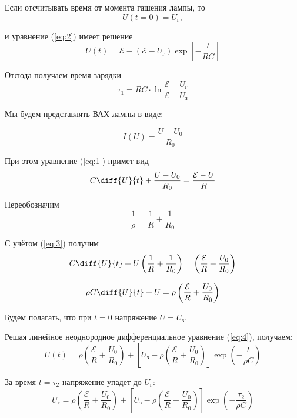 Если отсчитывать время от момента гашения лампы, то 
\begin{equation}
U(t=0)=U_{\text{г}},
\end{equation}

и уравнение (\ref{eq:2}) имеет решение
\begin{equation}
	U(t)= \mathcal{E}-(\mathcal{E}-U_{\text{г}}) \exp{\left[- \frac{t}{RC} \right] }
	\end{equation}

Отсюда получаем время зарядки
\begin{equation}
\label{tau:1}
	\tau_1=RC\cdot \ln \frac {\mathcal{E}-U_{\text{г}}} 	{\mathcal{E}-U_{\text{з}}}
	\end{equation}

Мы будем представлять ВАХ лампы в виде:


\begin{equation}
I(U)=\frac{U-U_0}{R_0}
\end{equation}

При этом уравнение (\ref{eq:1}) примет вид
\begin{equation}
C\diff{U}{t}+\frac{U-U_0}{R_0} = \frac{\mathcal{E}-U}{R}
	\end{equation}

Переобозначим 
\begin{equation}
\label{eq:3}
\frac{1}{\rho}=\frac{1}{R}+\frac{1}{R_0}
	\end{equation}

С учётом (\ref{eq:3}) получим
\begin{equation}
	C \diff{U}{t} +U \left( \frac{1}{R}+\frac{1}{R_0} \right)= \left( \frac{\mathcal{E}}{R}+\frac{U_0}{R_0}\right)
	\end{equation}

\begin{equation}
	\label{eq:4}
	\rho C \diff{U}{t}+U= \rho \left( \frac{\mathcal{E}}{R}+\frac{U_0}{R_0}\right)
	\end{equation}

Будем полагать, что при $t=0$ напряжение $U=U_{\text{з}}$.

Решая линейное неоднородное дифференциальное уравнение (\ref{eq:4}), получаем:
\begin{equation}
	U(t)=\rho \left(\frac{\mathcal{E}}{R}+\frac{U_0}{R_0} \right)+ \left[U_{\text{з}}- \rho\left(\frac{\mathcal{E}}{R}+\frac{U_0}{R_0} \right)\right]\exp{\left( - \frac{t}{\rho C} \right)} 
\end{equation}

За время $t=\tau_2$ напряжение упадет до $U_{\text{г}}$:
\begin{equation}
	U_{\text{г}}=\rho \left(\frac{\mathcal{E}}{R}+\frac{U_0}{R_0} \right)+ \left[U_{\text{з}}- \rho\left(\frac{\mathcal{E}}{R}+\frac{U_0}{R_0} \right)\right]\exp{\left( - \frac{\tau_2}{\rho C} \right)} 
\end{equation}

